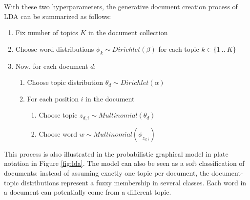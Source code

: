 \documentclass[
        a4paper,
        titlepage,
        twoside,
        parskip,
        numbers=noenddot
        ]{scrbook}
\theoremstyle{break}
\begin{document}
With these two hyperparameters, the generative document creation process of LDA can be summarized as follows:
\begin{enumerate}
       \item Fix number of topics $K$ in the document collection
       \item Choose word distributions $\phi_k \sim Dirichlet(\beta)$ for each topic $k \in \{1~..~K\}$
       \item Now, for each document $d$:
       \begin{enumerate}
              \item Choose topic distribution $\theta_d \sim Dirichlet(\alpha)$
              \item For each position $i$ in the document
              \begin{enumerate}
                     \item Choose topic $z_{d,i} \sim Multinomial(\theta_d)$
                     \item Choose word $w \sim Multinomial(\phi_{z_{d,i}})$
              \end{enumerate}
       \end{enumerate}
\end{enumerate}
This process is also illustrated in the probabilistic graphical model in plate notation in Figure \ref{fig:lda}.
The model can also be seen as a soft classification of documents: instead of assuming exactly one topic per document, the document-topic distributions represent a fuzzy membership in several classes.
Each word in a document can potentially come from a different topic.
\end{document}
